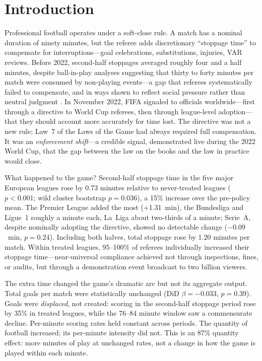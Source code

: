 
\section{Introduction}\label{sec:intro}

Professional football operates under a soft-close rule.  A match has a
nominal duration of ninety minutes, but the referee adds discretionary
``stoppage time'' to compensate for interruptions---goal celebrations,
substitutions, injuries, VAR reviews.  Before 2022, second-half
stoppages averaged roughly four and a half minutes, despite ball-in-play
analyses suggesting that thirty to forty minutes per match were consumed
by non-playing events---a gap that referees systematically failed to
compensate, and in ways shown to reflect social pressure rather than
neutral judgment \citep{garicano2005favoritism, dohmen2008professionals}.
In November 2022, FIFA signaled to officials worldwide---first through
a directive to World Cup referees, then through league-level
adoption---that they should account more accurately for time lost.  The directive was not a new rule; Law~7 of the
Laws of the Game had always required full compensation.  It was an
\emph{enforcement shift}---a credible signal, demonstrated live during
the 2022 World Cup, that the gap between the law on the books and the
law in practice would close.

What happened to the game?  Second-half stoppage time in the five major
European leagues rose by 0.73 minutes relative to never-treated leagues
($p < 0.001$; wild cluster bootstrap $p = 0.036$), a 15\% increase over
the pre-policy mean.  The Premier League added the most (+1.31~min), the
Bundesliga and Ligue~1 roughly a minute each, La~Liga about two-thirds
of a minute; Serie~A, despite nominally adopting the directive, showed no
detectable change ($-0.09$~min, $p = 0.24$).  Including both halves,
total stoppage rose by 1.20 minutes per match.  Within treated leagues,
95--100\% of referees individually increased their stoppage time---near-universal
compliance achieved not through inspections, fines, or audits, but through
a demonstration event broadcast to two billion viewers.

The extra time changed the game's dramatic arc but not its aggregate
output.  Total goals per match were statistically unchanged (DiD $\beta =
-0.033$, $p = 0.39$).  Goals were \emph{displaced}, not created: scoring
in the second-half stoppage period rose by 35\% in treated leagues, while
the 76--84 minute window saw a commensurate decline.  Per-minute scoring
rates held constant across periods.  The quantity of football
increased; its per-minute intensity did not.  This is an 87\% quantity
effect: more minutes of play at unchanged rates, not a change in how the
game is played within each minute.

